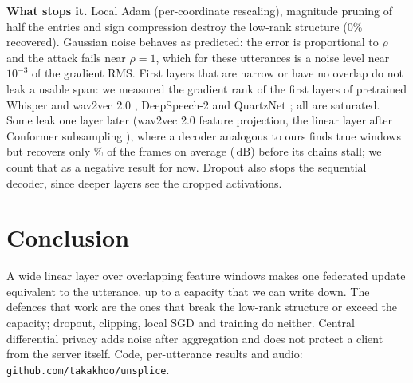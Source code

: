 \documentclass[a4paper]{esannV2}
\begin{document}
\textbf{What stops it.} Local Adam (per-coordinate rescaling), magnitude pruning of half the entries and
sign compression destroy the low-rank structure (0\% recovered). Gaussian noise behaves as predicted:
the error is proportional to $\rho$ and the attack fails near $\rho=1$, which for these utterances is a
noise level near $10^{-3}$ of the gradient RMS. First layers that are narrow or have no overlap do not
leak a usable span: we measured the gradient rank of the first layers of pretrained Whisper and wav2vec
2.0 \cite{baevski2020wav2vec}, DeepSpeech-2 \cite{amodei2015deep} and QuartzNet \cite{kriman2020quartznet};
all are saturated. Some leak one layer later (wav2vec 2.0 feature projection, the linear layer after
Conformer subsampling \cite{gulati2020conformer}), where a decoder analogous to ours finds true
windows but recovers only \ConfCov\% of the frames on average (\ConfSNR\,dB) before its chains stall; we
count that as a negative result for now. Dropout also stops the sequential decoder, since deeper layers
see the dropped activations.

\section{Conclusion}

A wide linear layer over overlapping feature windows makes one federated update equivalent to the
utterance, up to a capacity that we can write down. The defences that work are the ones that break the
low-rank structure or exceed the capacity; dropout, clipping, local SGD and training do neither. Central
differential privacy adds noise after aggregation and does not protect a client from the server itself.
Code, per-utterance results and audio: \texttt{github.com/takakhoo/unsplice}.

\begin{footnotesize}


\end{footnotesize}
\end{document}

